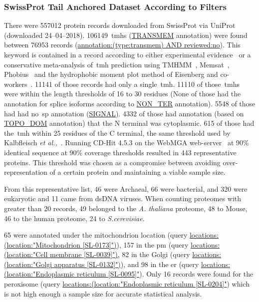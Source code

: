 \subsubsection{SwissProt Tail Anchored Dataset According to Filters}
There were 557012 protein records downloaded from SwissProt via UniProt~\cite{TheUniProtConsortium2014} (downloaded 24--04--2018).
106149~\gls{tmh}s (\url{TRANSMEM} annotation) were found between 76953 records (\url{annotation:(type:transmem) AND reviewed:no}).
This keyword is contained in a record according to either experimental evidence~\cite{TheUniProtConsortium2014} or a conservative meta-analysis of~\gls{tmh} prediction using TMHMM~\cite{Krogh2001}, Memsat~\cite{Jones2007}, Phobius~\cite{Kall2004,Kall2007} and the hydrophobic moment plot method of Eisenberg and co-workers~\cite{Eisenberg1984}.
11141 of those records had only a single~\gls{tmh}.
11110 of those~\gls{tmh}s were within the length thresholds of 16 to 30 residues (None of those had the annotation for splice isoforms according to \url{NON_TER} annotation).
5548 of those had had no~\gls{sp} annotation (\url{SIGNAL}).
4332 of those had annotation (based on \url{TOPO_DOM} annotation) that the N terminal was cytoplasmic.
615 of those had the~\gls{tmh} within 25 residues of the C terminal, the same threshold used by Kalbfleisch \textit{et al.,}~\cite{Kalbfleisch2007}.
Running CD-Hit 4.5.3 on the WebMGA web-server~\cite{Huang2010, Wu2011} at 90\% identical sequence at 90\% coverage thresholds resulted in 443 representative proteins.
This threshold was chosen as a compromise between avoiding over-representation of a certain protein and maintaining a viable sample size.

From this representative list, 46 were Archaeal, 66 were bacterial, and 320 were eukaryotic and 11 came from dsDNA viruses.
When counting proteomes with greater than 20 records, 49 belonged to the \textit{A. thaliana} proteome, 48 to Mouse, 46 to the human proteome, 24 to \textit{S.cerevisiae}. %

65 were annotated under the mitochondrion location (query \url{locations:(location:"Mitochondrion [SL-0173]")}), 157 in the \gls{pm} (query \url{locations:(location:"Cell membrane [SL-0039]")}, 82 in the Golgi (query \url{locations:(location:"Golgi apparatus [SL-0132]")}), and 98 in the \gls{er} (query \url{locations:(location:"Endoplasmic reticulum [SL-0095]"}).
Only 16 records were found for the peroxisome (query \url{locations:(location:"Endoplasmic reticulum [SL-0204]"}) which is not high enough a sample size for accurate statistical analysis.


